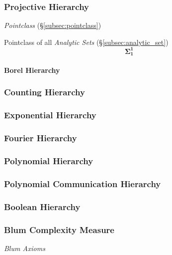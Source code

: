 \documentclass{article}
\begin{document}
\subsubsection{Projective Hierarchy}\label{subsec:projective_hierarchy}

\emph{Pointclass} (\S\ref{subsec:pointclass})

Pointclass of all \emph{Analytic Sets} (\S\ref{subsec:analytic_set})
\[
    \mathbf{\Sigma^1_1}
\]

\paragraph{Borel Hierarchy}



\subsubsection{Counting Hierarchy}

\subsubsection{Exponential Hierarchy}

\subsubsection{Fourier Hierarchy}

\subsubsection{Polynomial Hierarchy}

\subsubsection{Polynomial Communication Hierarchy}

\subsubsection{Boolean Hierarchy}




\subsubsection{Blum Complexity Measure}

\emph{Blum Axioms}



\end{document}
